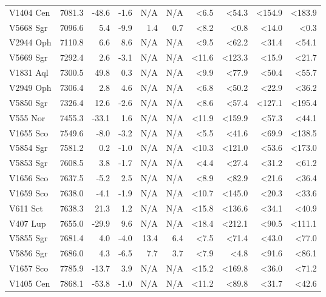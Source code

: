 \documentclass{aa}
\begin{document}
\begin{longtable}{lrrrrrrrrr}
	V1404 Cen &  7081.3 &  -48.6 &  -1.6 &   N/A &       N/A &   <6.5 &   <54.3 &   <154.9 &  <183.9 \\
	V5668 Sgr &  7096.6 &    5.4 &  -9.9 &   1.4 &       0.7 &   <8.2 &    <0.8 &    <14.0 &    <0.3 \\
	V2944 Oph &  7110.8 &    6.6 &   8.6 &   N/A &       N/A &   <9.5 &   <62.2 &    <31.4 &   <54.1 \\
	V5669 Sgr &  7292.4 &    2.6 &  -3.1 &   N/A &       N/A &  <11.6 &  <123.3 &    <15.9 &   <21.7 \\
	V1831 Aql &  7300.5 &   49.8 &   0.3 &   N/A &       N/A &   <9.9 &   <77.9 &    <50.4 &   <55.7 \\
	V2949 Oph &  7306.4 &    2.8 &   4.6 &   N/A &       N/A &   <6.8 &   <50.2 &    <22.9 &   <36.2 \\
	V5850 Sgr &  7326.4 &   12.6 &  -2.6 &   N/A &       N/A &   <8.6 &   <57.4 &   <127.1 &  <195.4 \\
	V555 Nor &  7455.3 &  -33.1 &   1.6 &   N/A &       N/A &  <11.9 &  <159.9 &    <57.3 &   <44.1 \\
	V1655 Sco &  7549.6 &   -8.0 &  -3.2 &   N/A &       N/A &   <5.5 &   <41.6 &    <69.9 &  <138.5 \\
	V5854 Sgr  &  7581.2 &    0.2 &  -1.0 &   N/A &       N/A &  <10.3 &  <121.0 &    <53.6 &  <173.0 \\
	V5853 Sgr &  7608.5 &    3.8 &  -1.7 &   N/A &       N/A &   <4.4 &   <27.4 &    <31.2 &   <61.2 \\
	V1656 Sco &  7637.5 &   -5.2 &   2.5 &   N/A &       N/A &   <8.9 &   <82.9 &    <21.6 &   <36.4 \\
	V1659 Sco &  7638.0 &   -4.1 &  -1.9 &   N/A &       N/A &  <10.7 &  <145.0 &    <20.3 &   <33.6 \\
	V611 Sct &  7638.3 &   21.3 &   1.2 &   N/A &       N/A &  <15.8 &  <136.6 &    <34.1 &   <40.9 \\
	V407 Lup &  7655.0 &  -29.9 &   9.6 &   N/A &       N/A &  <18.4 &  <212.1 &    <90.5 &  <111.1 \\
	V5855 Sgr &  7681.4 &    4.0 &  -4.0 &  13.4 &       6.4 &   <7.5 &   <71.4 &    <43.0 &   <77.0 \\
	V5856 Sgr &  7686.0 &    4.3 &  -6.5 &   7.7 &       3.7 &   <7.9 &    <4.8 &    <91.6 &   <86.1 \\
	V1657 Sco &  7785.9 &  -13.7 &   3.9 &   N/A &       N/A &  <15.2 &  <169.8 &    <36.0 &   <71.2 \\
	V1405 Cen &  7868.1 &  -53.8 &  -1.0 &   N/A &       N/A &  <11.2 &   <89.8 &    <31.7 &   <42.6 \\

\end{longtable}
\end{document}
